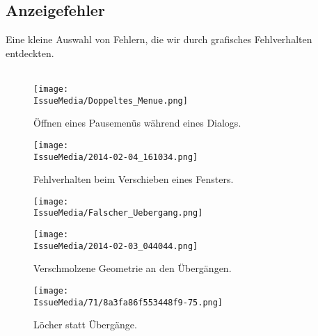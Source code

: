 %



\clearpage


	
	
\subsection*{Anzeigefehler}

Eine kleine Auswahl von Fehlern, die wir durch grafisches Fehlverhalten entdeckten.\\~\\


%
%	
%	
%


\begin{figure}[ht]

	\centering
	\label{Anhang:Grafikfehler:Dialog_Pause}
	
	\texttt{[image: \\IssueMedia/Doppeltes\_Menue.png]}
	
	\caption{Öffnen eines Pausemenüs während eines Dialogs.}

\end{figure}

\begin{figure}[ht]

	\centering
	\label{Anhang:Grafikfehler:Fenster_Schieben}
	
	\texttt{[image: \\IssueMedia/2014-02-04\_161034.png]}
	
	\caption{Fehlverhalten beim Verschieben eines Fensters.}

\end{figure}



\clearpage



\begin{figure}[ht!]

	\centering
	\label{Anhang:Grafikfehler:Verschmolzene_Geometrie}
	
	\texttt{[image: \\IssueMedia/Falscher\_Uebergang.png]}

\end{figure}


\begin{figure}[ht!]

	\centering
	
	\texttt{[image: \\IssueMedia/2014-02-03\_044044.png]}
	
	\caption{Verschmolzene Geometrie an den Übergängen.}

\end{figure}



\clearpage



\begin{figure}[ht]

	\centering
	\label{Anhang:Grafikfehler:Loechrige_Uebergaenge}
	
	\texttt{[image: \\IssueMedia/71/8a3fa86f553448f9-75.png]}
	
	\caption{Löcher statt Übergänge.}

\end{figure}

